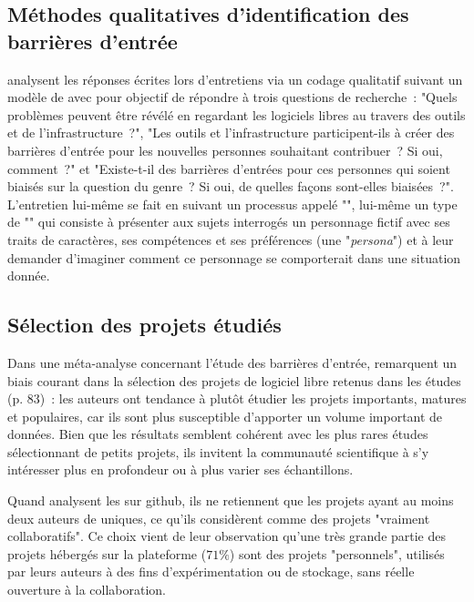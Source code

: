 \subsection{Méthodes qualitatives d'identification des barrières d'entrée}

\textcite[p.~1006]{barriers-2018} analysent les réponses écrites lors d'entretiens via un codage qualitatif
suivant un modèle de  avec pour objectif de répondre à trois questions de
recherche : "Quels problèmes peuvent être révélé en regardant les logiciels libres au travers des outils et de
l'infrastructure ?", "Les outils et l'infrastructure participent-ils à créer des barrières d'entrée pour les
nouvelles personnes souhaitant contribuer ? Si oui, comment ?" et "Existe-t-il des barrières d'entrées pour
ces personnes qui soient biaisés sur la question du genre ? Si oui, de quelles façons sont-elles biaisées ?".
L'entretien lui-même se fait en suivant un processus appelé "", lui-même un type de
"" qui consiste à présenter aux sujets interrogés un personnage fictif avec ses
traits de caractères, ses compétences et ses préférences (une "\emph{persona}") et à leur demander d'imaginer
comment ce personnage se comporterait dans une situation donnée.

\subsection{Sélection des projets étudiés}

Dans une méta-analyse concernant l'étude des barrières d'entrée,  remarquent
un biais courant dans la sélection des projets de logiciel libre retenus dans les études (p. 83) : les auteurs
ont tendance à plutôt étudier les projets importants, matures et populaires, car ils sont plus susceptible
d'apporter un volume important de données. Bien que les résultats semblent cohérent avec les plus rares études
sélectionnant de petits projets, ils invitent la communauté scientifique à s'y intéresser plus en profondeur
ou à plus varier ses échantillons.

Quand  analysent les  sur \gls{github}, ils ne
retiennent que les projets ayant au moins deux auteurs de  uniques, ce qu'ils considèrent comme
des projets "vraiment collaboratifs". Ce choix vient de leur observation qu'une très grande partie des projets
hébergés sur la plateforme ($71\%$) sont des projets "personnels", utilisés par leurs auteurs à des fins
d'expérimentation ou de stockage, sans réelle ouverture à la collaboration.

